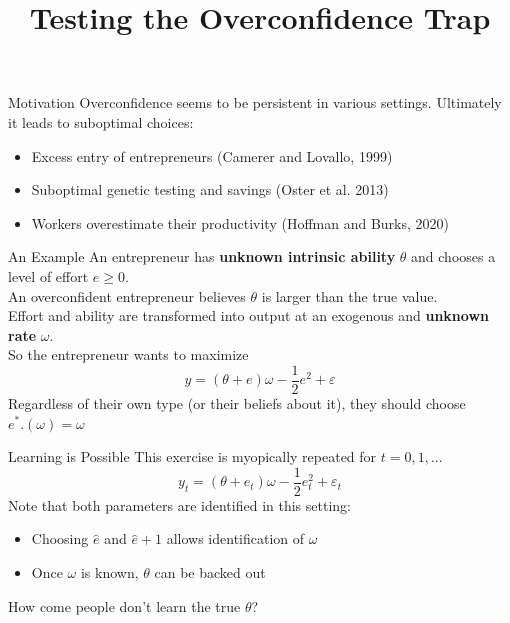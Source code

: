 \documentclass[aspectratio=169]{beamer}
\title{Testing the Overconfidence Trap}
\begin{document}
\frame{\titlepage}

\begin{frame}{Motivation}
    Overconfidence seems to be persistent in various settings. Ultimately it leads to suboptimal choices:
    \begin{itemize} 
        \item Excess entry of entrepreneurs (Camerer and Lovallo, 1999)
        \item Suboptimal genetic testing and savings (Oster et al. 2013)
        \item  Workers overestimate their productivity (Hoffman and Burks, 2020)
    \end{itemize}
    \bigskip
    
\end{frame}

\begin{frame}{An Example}
    An entrepreneur has \textbf{unknown intrinsic ability} $\theta$ and chooses a level of effort $e\geq 0.$ \\
    \bigskip
    An overconfident entrepreneur believes $\theta$ is larger than the true value.\\
    \bigskip
    Effort and ability are transformed into output at an exogenous and \textbf{unknown rate} $\omega.$\\
    \bigskip 
    So the entrepreneur wants to maximize \\
        $$y = (\theta + e)\omega-\frac{1}{2}e^2 +\varepsilon$$
    \pause
    Regardless of their own type (or their beliefs about it), they should choose $e^*.(\omega)=\omega$\\
\end{frame}

\begin{frame}{Learning is Possible}
    This exercise is myopically repeated for $t=0, 1, ...$
        $$y_t = (\theta + e_t)\omega-\frac{1}{2}e_t^2 +\varepsilon_t$$
    Note that both parameters are identified in this setting:\\
    \bigskip
    \begin{itemize}
        \item Choosing $\hat{e}$ and $\hat{e}+1$ allows identification of $\omega$\\
        \bigskip
        \item Once $\omega$ is known, $\theta$ can be backed out\\
     \end{itemize}
    \bigskip
    How come people don't learn the true $\theta$?
\end{frame}
\end{document}
